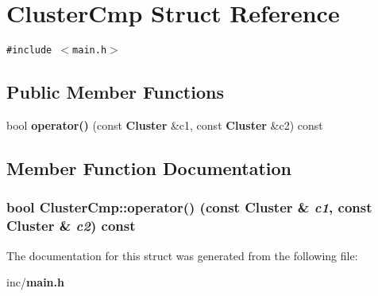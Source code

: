 \section{ClusterCmp Struct Reference}
\label{structClusterCmp}
{\tt \#include $<$main.h$>$}

\subsection*{Public Member Functions}
\begin{CompactItemize}
\item 
bool {\bf operator()} (const {\bf Cluster} \&c1, const {\bf Cluster} \&c2) const
\end{CompactItemize}


\subsection{Member Function Documentation}
\subsubsection{\setlength{\rightskip}{0pt plus 5cm}bool ClusterCmp::operator() (const {\bf Cluster} \& {\em c1}, const {\bf Cluster} \& {\em c2}) const\hspace{0.3cm}{\tt  [inline]}}\label{structClusterCmp_ebf1bbed30dee33111a745a469dbb474}




The documentation for this struct was generated from the following file:\begin{CompactItemize}
\item 
inc/{\bf main.h}\end{CompactItemize}

